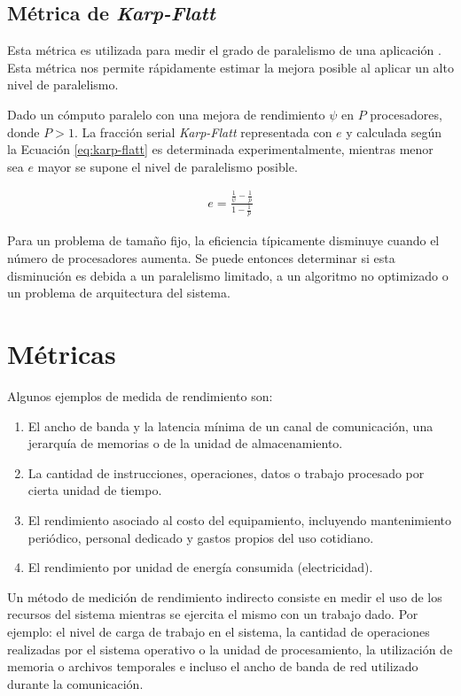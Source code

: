 \documentclass[a4paper]{report}
\begin{document}
\subsection{Métrica de {\it Karp-Flatt}}

Esta métrica es utilizada para medir el grado de paralelismo de una aplicación \cite{karp-flatt}. Esta métrica nos permite rápidamente estimar la mejora posible al aplicar un alto nivel de paralelismo.

\bigskip

Dado un cómputo paralelo con una mejora de rendimiento $ \psi $ en $ P $
procesadores, donde $ P > 1 $. La fracción serial {\it Karp-Flatt} representada con $ e $ y calculada según la Ecuación \ref{eq:karp-flatt} es determinada experimentalmente, mientras menor sea $ e $ mayor se supone el nivel de paralelismo posible.

\begin{eqnarray}
\label{eq:karp-flatt}
 e = \frac{\frac{1}{\psi} - \frac{1}{p}}{1 - \frac{1}{p}} 
\end{eqnarray}

Para un problema de tamaño fijo, la eficiencia típicamente disminuye cuando
el número de procesadores aumenta. Se puede entonces determinar si esta disminución
es debida a un paralelismo limitado, a un algoritmo no optimizado o un problema de
arquitectura del sistema.

\section{Métricas}

Algunos ejemplos de medida de rendimiento son:

\begin{enumerate}
\item El ancho de banda y la latencia mínima de un canal de comunicación,
  una jerarquía de memorias o de la unidad de almacenamiento.
\item La cantidad de instrucciones, operaciones, datos o trabajo procesado
  por cierta unidad de tiempo.
\item El rendimiento asociado al costo del equipamiento, incluyendo mantenimiento
 periódico, personal dedicado y gastos propios del uso cotidiano.
\item El rendimiento por unidad de energía consumida (electricidad).

\end{enumerate}

Un método de medición de rendimiento indirecto consiste en medir el uso de
los recursos del sistema mientras se ejercita el mismo con un trabajo dado.
Por ejemplo: el nivel de carga de trabajo en el sistema, la cantidad de operaciones realizadas por el
sistema operativo o la unidad de procesamiento, la utilización de memoria o
archivos temporales e incluso el ancho de banda de red utilizado durante la comunicación.
\end{document}
